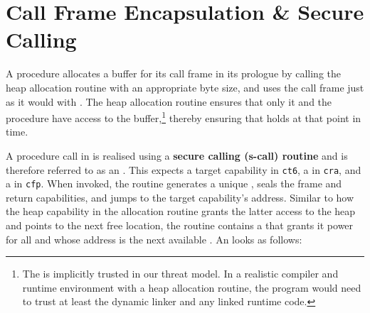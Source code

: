 \documentclass[main.tex]{subfiles}
\begin{document}
\section{Call Frame Encapsulation \& Secure Calling} \label{sct:ghscc}
A procedure allocates a buffer for its call frame in its prologue by calling the heap allocation routine with an appropriate byte size, and uses the call frame just as it would with . The heap allocation routine ensures that only it and the procedure have access to the buffer,\footnote{The  is implicitly trusted in our threat model. In a realistic compiler and runtime environment with a heap allocation routine, the program would need to trust at least the dynamic linker and any linked runtime code.} thereby ensuring that  holds at that point in time.

A procedure call in  is realised using a \textbf{secure calling (s-call) routine} and is therefore referred to as an \textbf{}. This  expects a target capability in \texttt{ct6}, a  in \texttt{cra}, and a  in \texttt{cfp}. When invoked, the routine generates a unique , seals the frame and return capabilities, and jumps to the target capability's address. Similar to how the heap capability in the allocation routine grants the latter access to the heap and points to the next free location, the  routine contains a  that grants it  power for all  and whose address is the next available . An  looks as follows:
\end{document}
